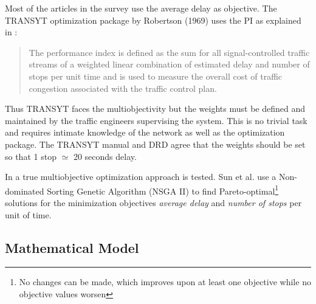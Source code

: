Most of the articles in the survey use the average delay as objective. The TRANSYT optimization package by Robertson (1969) uses the PI as explained in \cite{26}:

\begin{quote}
The performance index
is defined as the sum for all signal-controlled traffic streams of a
weighted linear combination of estimated delay and number
of stops per unit time and is used to measure the overall cost of
traffic congestion associated with the traffic control plan.
\end{quote}

Thus TRANSYT faces the multiobjectivity but the weights must be defined and maintained by the traffic engineers supervising the system. This is no trivial task and requires intimate knowledge of the network as well as the optimization package. The TRANSYT manual and DRD agree that the weights should be set so that 1 stop $\simeq$ 20 seconds delay.

In \cite{41} a true multiobjective optimization approach is tested. Sun et al. use a Non-dominated Sorting Genetic Algorithm (NSGA II) to find Pareto-optimal\footnote{No changes can be made, which improves upon at least one objective while no objective values worsen} solutions for the minimization objectives \textit{average delay} and \textit{number of stops} per unit of time. 

\subsection{Mathematical Model}
